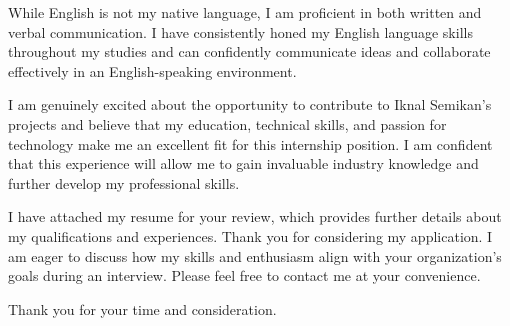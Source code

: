 \documentclass[11pt, a4paper]{configuration}
\begin{document}
\begin{cvletter}
While English is not my native language, I am proficient in both written and verbal communication. I have consistently honed my English language skills throughout my studies and can confidently communicate ideas and collaborate effectively in an English-speaking environment.

I am genuinely excited about the opportunity to contribute to Iknal Semikan's projects and believe that my education, technical skills, and passion for technology make me an excellent fit for this internship position. I am confident that this experience will allow me to gain invaluable industry knowledge and further develop my professional skills.

I have attached my resume for your review, which provides further details about my qualifications and experiences. Thank you for considering my application. I am eager to discuss how my skills and enthusiasm align with your organization's goals during an interview. Please feel free to contact me at your convenience.

Thank you for your time and consideration.

\end{cvletter}


\makeletterclosing
\end{document}
